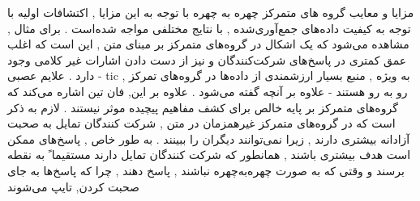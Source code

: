 \documentclass{beamer}
\begin{document}
\begin{persian}
\begin{frame}{مزایا و معایب گروه های متمرکز چهره به چهره }
با توجه به این مزایا , اکتشافات اولیه با توجه به کیفیت داده‌های جمع‌آوری‌شده , با نتایج مختلفی مواجه شده‌است . برای مثال , مشاهده می‌شود که یک اشکال در گروه‌های متمرکز بر مبنای متن , این است که اغلب عمق کمتری در پاسخ‌های شرکت‌کنندگان و نیز از دست دادن اشارات غیر کلامی وجود دارد . علایم عصبی - tic , به ویژه , منبع بسیار ارزشمندی از داده‌ها در گروه‌های تمرکز رو به رو هستند - علاوه بر آنچه گفته می‌شود . علاوه بر این, فان تین اشاره می‌کند که گروه‌های متمرکز بر پایه خالص برای کشف مفاهیم پیچیده موثر نیستند . لازم به ذکر است که در گروه‌های متمرکز غیرهمزمان در متن , شرکت کنندگان تمایل به صحبت آزادانه بیشتری دارند , زیرا نمی‌توانند دیگران را ببینند . به طور خاص , پاسخ‌های ممکن است هدف بیشتری باشند , همانطور که شرکت کنندگان تمایل دارند مستقیما ً به نقطه برسند و وقتی که به صورت چهره‌به‌چهره نباشند , پاسخ دهند , چرا که پاسخ‌ها به جای صحبت کردن, تایپ می‌شوند
\end{frame}


	


\end{persian}
\end{document}
